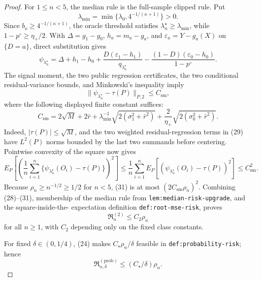 \documentclass{article}
\begin{document}
\begin{proof}
For \(1\leq n<5\), the median rule is the full-sample clipped rule.  Put
\[
\lambda_{\min}=\min\{\lambda_0,4^{-1/(\kappa+1)}\}>0.
\]
Since \(b_o\geq4^{-1/(\kappa+1)}\), the oracle threshold satisfies
\(\lambda_n^\star\geq\lambda_{\min}\), while
\(1-p^\circ\geq\eta_+/2\).  With
\(\Delta=g_1-g_0\), \(h_a=m_a-g_a\), and
\(\varepsilon_a=Y-g_a(X)\) on \(\{D=a\}\), direct substitution gives
\[
\psi_{\lambda_n^\star}
=\Delta+h_1-h_0
+\frac{D(\varepsilon_1-h_1)}{q_{\lambda_n^\star}}
-\frac{(1-D)(\varepsilon_0-h_0)}{1-p^\circ}.                       \tag{29}
\]
The signal moment, the two public regression certificates, the two conditional
residual-variance bounds, and Minkowski's inequality imply
\[
\|\psi_{\lambda_n^\star}-\tau(P)\|_{P,2}\leq C_{\mathrm{sm}},      \tag{30}
\]
where the following displayed finite constant suffices:
\[
C_{\mathrm{sm}}
=2\sqrt M+2\bar r
+\lambda_{\min}^{-1}\sqrt{2(\sigma_1^2+\bar r^2)}
+\frac2{\eta_+}\sqrt{2(\sigma_0^2+\bar r^2)}.
\]
Indeed, \(|\tau(P)|\leq\sqrt M\), and the two weighted residual-regression
terms in (29) have \(L^2(P)\) norms bounded by the last two summands before
centering.  Pointwise convexity of the square now gives
\[
E_P\!\left[\left(\frac1n\sum_{i=1}^n
\{\psi_{\lambda_n^\star}(O_i)-\tau(P)\}\right)^2\right]
\leq\frac1n\sum_{i=1}^n
E_P[(\psi_{\lambda_n^\star}(O_i)-\tau(P))^2]
\leq C_{\mathrm{sm}}^2.                                           \tag{31}
\]
Because \(\rho_n\geq n^{-1/2}\geq1/2\) for \(n<5\), (31) is at most
\((2C_{\mathrm{sm}}\rho_n)^2\).  Combining (28)--(31), membership of the
median rule from \texttt{lem:median-risk-upgrade}, and the square-inside-the-
expectation definition \texttt{def:root-mse-risk}, proves
\[
\mathfrak R_n^{(2)}\leq C_2\rho_n                                  \tag{32}
\]
for all \(n\geq1\), with \(C_2\) depending only on the fixed class constants.

For fixed \(\delta\in(0,1/4)\), (24) makes
\(C_\star\rho_n/\delta\) feasible in
\texttt{def:probability-risk}; hence
\[
\mathfrak R_{n,\delta}^{(\mathrm{prob})}
\leq(C_\star/\delta)\rho_n.                                       \tag{33}
\]


\end{proof}
\end{document}
